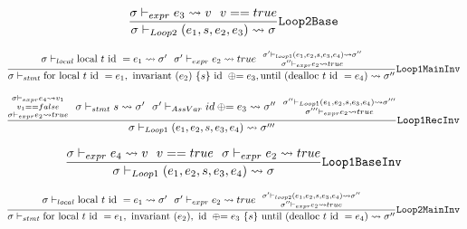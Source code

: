 \begin{equation} \label{eq:loop2Base}
    \frac{\sigma \vdash_{expr} e_3 \leadsto v ~~
        v == true}
    {\sigma \vdash_{Loop2} (e_1, s, e_2, e_3) \leadsto \sigma}
    \text{\texttt{Loop2Base}}
\end{equation}

\begin{equation} \label{eq:loop1MainInv}
    \frac{\sigma \vdash_{local} \text{local } t \text{ id } = e_1 \leadsto \sigma' ~~
        \sigma' \vdash_{expr} e_2 \leadsto true ~~
        \substack{\sigma' \vdash_{loop1} (e_1, e_2, s, e_3, e_4) \leadsto \sigma'' \\
            \sigma'' \vdash_{expr} e_2 \leadsto true}}
    {\sigma \vdash_{stmt} \text{for local }t\text{ id }= e_1, \text{ invariant }(e_2) ~\{s\}\text{ id }\oplus{\kern-5.0pt}= e_3, \text{until (dealloc } t\text{ id }= e_4) \leadsto \sigma''}
    \text{\texttt{Loop1MainInv}}
\end{equation}

\begin{equation} \label{eq:loop1RecInv}
    \frac{\substack{\sigma \vdash_{expr} e_4 \leadsto v_1 \\
            v_1 == false \\
            \sigma \vdash_{expr} e_2 \leadsto true} ~~
        \sigma \vdash_{stmt} s \leadsto \sigma' ~~
        \sigma' \vdash_{AssVar} id \oplus{\kern-5.0pt}= e_3 \leadsto \sigma'' ~~
        \substack{\sigma'' \vdash_{Loop1} (e_1, e_2, s, e_3, e_4) \leadsto \sigma''' \\
        \sigma''' \vdash_{expr} e_2 \leadsto true}}
    {\sigma \vdash_{Loop1} (e_1, e_2, s, e_3, e_4) \leadsto \sigma'''}
    \text{\texttt{Loop1RecInv}}
\end{equation}

\begin{equation} \label{eq:loop1BaseInv}
    \frac{\sigma \vdash_{expr} e_4 \leadsto v ~~
        v == true ~~
        \sigma \vdash_{expr} e_2 \leadsto true}
    {\sigma \vdash_{Loop1} (e_1, e_2, s, e_3, e_4) \leadsto \sigma}
    \text{\texttt{Loop1BaseInv}}
\end{equation}

\begin{equation} \label{eq:loop2MainInv}
    \frac{\sigma \vdash_{local} \text{local } t \text{ id } = e_1 \leadsto \sigma' ~~
        \sigma' \vdash_{expr} e_2 \leadsto true ~~
        \substack{\sigma' \vdash_{loop2} (e_1, e_2, s, e_3, e_4) \leadsto \sigma'' \\
            \sigma'' \vdash_{expr} e_2 \leadsto true}}
    {\sigma \vdash_{stmt} \text{for local }t\text{ id }= e_1, \text{ invariant }(e_2), \text{ id }\oplus{\kern-5.0pt}= e_3 ~\{s\} \text{ until (dealloc } t\text{ id }= e_4) \leadsto \sigma''}
    \text{\texttt{Loop2MainInv}}
\end{equation}

